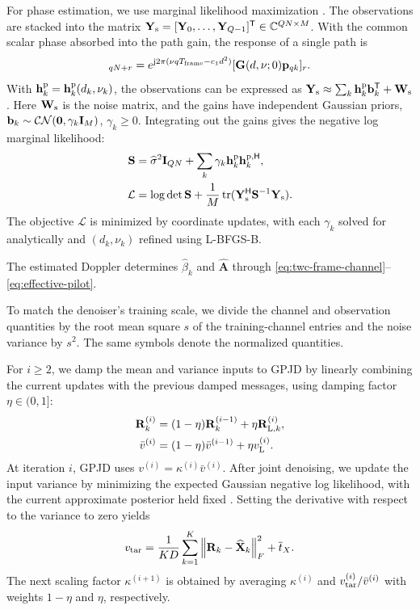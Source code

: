 For phase estimation, we use marginal likelihood maximization
\cite{tipping2003}. The observations are stacked into the matrix
$\mathbf Y_{\rm s}=[\mathbf Y_0,\ldots,\mathbf Y_{Q-1}]^{\mathsf T}
\in\mathbb C^{QN\times M}$.
With the common scalar phase absorbed into the path gain,
the response of a single path is
\begin{equation}
 [\mathbf h_k^{\rm p}(d,\nu)]_{qN+r}
 =e^{\mathrm j2\pi(\nu qT_{\rm frame}-c_1d^2)}
 [\mathbf G(d,\nu;0)\mathbf p_{qk}]_r.
 \label{eq:phase-atom}
\end{equation}
With $\mathbf h_k^{\rm p}=\mathbf h_k^{\rm p}(d_k,\nu_k)$, the
observations can be expressed as
$\mathbf Y_{\rm s}\approx\sum_k\mathbf h_k^{\rm p}\mathbf b_k^{\mathsf T}
+\mathbf W_{\rm s}$.
Here $\mathbf W_{\rm s}$ is the noise matrix, and the gains have
independent Gaussian priors, $\mathbf b_k\sim\mathcal{CN}(\mathbf0,\gamma_k\mathbf{I}_M)$,
$\gamma_k\geq0$.
Integrating out the gains gives the negative log marginal likelihood:
\begin{align}
 \mathbf S&=\widehat\sigma^2\mathbf{I}_{QN}
 +\sum_k\gamma_k\mathbf h_k^{\rm p}\mathbf h_k^{{\rm p},\mathsf H},
 \label{eq:phase-covariance}\\
 \mathcal L&=\log\det\mathbf S+
 \frac1M\operatorname{tr}(\mathbf Y_{\rm s}^{\mathsf H}\mathbf S^{-1}\mathbf Y_{\rm s}).
 \label{eq:phase-objective}
\end{align}
The objective $\mathcal L$ is minimized by coordinate updates, with
each $\gamma_k$ solved for analytically and $(d_k,\nu_k)$ refined
using L-BFGS-B.

The estimated Doppler determines $\widehat\beta_k$ and
$\widehat{\mathbf A}$ through
\eqref{eq:twc-frame-channel}--\eqref{eq:effective-pilot}.

To match the denoiser's training scale, we divide the channel and
observation quantities by the root mean square $s$ of the
training-channel entries and the noise variance by $s^2$.
The same symbols denote the normalized quantities.

For $i\geq2$, we damp the mean and variance inputs to GPJD by
linearly combining the current updates with the previous damped
messages, using damping factor $\eta\in(0,1]$:
\begin{align}
 \mathbf R_k^{(i)}&=(1-\eta)\mathbf R_k^{(i-1)}+\eta \mathbf R_{{\rm L},k}^{(i)},
 \label{eq:input-damping}\\
 \bar v^{(i)}&=(1-\eta)\bar v^{(i-1)}+\eta v_{\rm L}^{(i)}.
 \label{eq:input-variance-damping}
\end{align}
At iteration $i$, GPJD uses $v^{(i)}=\kappa^{(i)}\bar v^{(i)}$.
After joint denoising, we update the input variance by minimizing
the expected Gaussian negative log likelihood, with the current
approximate posterior held fixed \cite{vila2013}.
Setting the derivative with respect to the variance to zero yields
\begin{equation}
 v_{\rm tar}=\frac{1}{KD}\sum_{k=1}^K
 \left\lVert\mathbf R_k-\widehat{\mathbf X}_k\right\rVert_F^2+\overline t_X.
 \label{eq:query-variance-target}
\end{equation}
The next scaling factor $\kappa^{(i+1)}$ is obtained by averaging
$\kappa^{(i)}$ and $v_{\rm tar}^{(i)}/\bar v^{(i)}$ with weights
$1-\eta$ and $\eta$, respectively.

